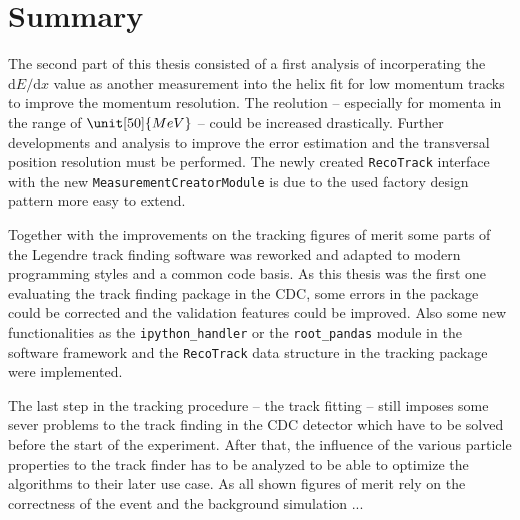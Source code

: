 \chapter*{Summary}


The second part of this thesis consisted of a first analysis of incorperating the $\mathrm dE/\mathrm d x$ value as another measurement into the helix fit for low momentum tracks to improve the momentum resolution. The reolution -- especially for momenta in the range of $\unit[50]{MeV}$ -- could be increased drastically. Further developments and analysis to improve the error estimation and the transversal position resolution must be performed. The newly created \texttt{RecoTrack} interface with the new \texttt{MeasurementCreatorModule} is due to the used factory design pattern more easy to extend.

Together with the improvements on the tracking figures of merit some parts of the Legendre track finding software was reworked and adapted to modern programming styles and a common code basis. As this thesis was the first one evaluating the track finding package in the CDC, some errors in the package could be corrected and the validation features could be improved. Also some new functionalities as the \texttt{ipython\_handler} or the \texttt{root\_pandas} module in the software framework and the \texttt{RecoTrack} data structure in the tracking package were implemented.

The last step in the tracking procedure -- the track fitting -- still imposes some sever problems to the track finding in the CDC detector which have to be solved before the start of the experiment. After that, the influence of the various particle properties to the track finder has to be analyzed to be able to optimize the algorithms to their later use case. As all shown figures of merit rely on the correctness of the event and the background simulation ...